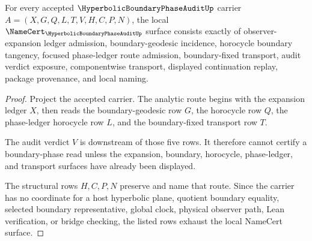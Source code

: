 \begin{theorem}
\label{thm:hyperbolic-boundary-phase-audit-namecert-obligations}
For every accepted $\HyperbolicBoundaryPhaseAuditUp$ carrier $A=(X,G,Q,L,T,V,H,C,P,N)$, the local $\NameCert_{\HyperbolicBoundaryPhaseAuditUp}$ surface consists exactly of observer-expansion ledger admission, boundary-geodesic incidence, horocycle boundary tangency, focused phase-ledger route admission, boundary-fixed transport, audit verdict exposure, componentwise transport, displayed continuation replay, package provenance, and local naming.
\end{theorem}
\begin{proof}
Project the accepted carrier. The analytic route begins with the expansion ledger $X$, then reads the boundary-geodesic row $G$, the horocycle row $Q$, the phase-ledger horocycle row $L$, and the boundary-fixed transport row $T$.

The audit verdict $V$ is downstream of those five rows. It therefore cannot certify a boundary-phase read unless the expansion, boundary, horocycle, phase-ledger, and transport surfaces have already been displayed.

The structural rows $H,C,P,N$ preserve and name that route. Since the carrier has no coordinate for a host hyperbolic plane, quotient boundary equality, selected boundary representative, global clock, physical observer path, Lean verification, or bridge checking, the listed rows exhaust the local NameCert surface.
\end{proof}

